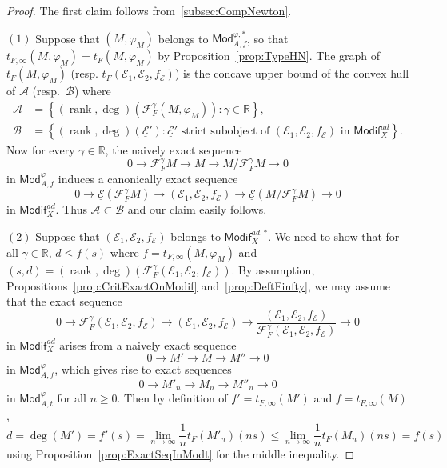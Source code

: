 \documentclass[11pt]{article}
\theoremstyle{definition}
\numberwithin{equation}{section}
\numberwithin{figure}{section}
\numberwithin{table}{section}
\newcommand{\Mod}{\mathsf{Mod}}
\newcommand{\Modif}{\mathsf{Modif}}
\DeclareMathOperator{\rank}{rank}
\begin{document}
\begin{proof}
The first claim follows from~\ref{subsec:CompNewton}.

$(1)$
Suppose that $(M,\varphi_{M})$ belongs to $\Mod_{A,f}^{\varphi,\ast}$, so that $t_{F,\infty}(M,\varphi_{M})=t_{F}(M,\varphi_{M})$ by Proposition~\ref{prop:TypeHN}. The graph of $t_{F}(M,\varphi_{M})$ (resp. $t_{F}(\mathcal{E}_{1},\mathcal{E}_{2},f_{\mathcal{E}})$) is the concave upper bound of the convex hull of $\mathcal{A}$ (resp.~$\mathcal{B}$) where
\begin{align*}
\mathcal{A} & = \left\{ (\rank,\deg)\left(\mathcal{F}_{F}^{\gamma}(M,\varphi_{M})\right):\gamma\in\mathbb{R}\right\},\\
\mathcal{B} & = \left\{ (\rank,\deg)\left(\underline{\mathcal{E}}'\right):\underline{\mathcal{E}}'\text{ strict subobject of }(\mathcal{E}_{1},\mathcal{E}_{2},f_{\mathcal{E}})\text{ in }\Modif_{X}^{ad}\right\}.
\end{align*}
Now for every $\gamma\in\mathbb{R}$, the naively exact sequence
\[
0\rightarrow\mathcal{F}_{F}^{\gamma}M\rightarrow M\rightarrow M/\mathcal{F}_{F}^{\gamma}M\rightarrow0
\]
in $\Mod_{A,f}^{\varphi}$ induces a canonically exact sequence
\[
0\rightarrow\underline{\mathcal{E}}\left(\mathcal{F}_{F}^{\gamma}M\right)\rightarrow(\mathcal{E}_{1},\mathcal{E}_{2},f_{\mathcal{E}})\rightarrow\underline{\mathcal{E}}\left(M/\mathcal{F}_{F}^{\gamma}M\right)\rightarrow0
\]
in $\Modif_{X}^{ad}$. Thus $\mathcal{A}\subset\mathcal{B}$ and our claim easily follows.

$(2)$
Suppose that $(\mathcal{E}_{1},\mathcal{E}_{2},f_{\mathcal{E}})$ belongs to $\Modif_{X}^{ad,\ast}$. We need to show that for all $\gamma\in\mathbb{R}$, $d\leq f(s)$ where $f=t_{F,\infty}(M,\varphi_{M})$ and $(s,d)=(\rank,\deg)\left(\mathcal{F}_{F}^{\gamma}(\mathcal{E}_{1},\mathcal{E}_{2},f_{\mathcal{E}})\right)$. By assumption, Propositions~\ref{prop:CritExactOnModif} and~\ref{prop:DeftFinfty}, we may assume that the exact sequence
\[
0\rightarrow\mathcal{F}_{F}^{\gamma}(\mathcal{E}_{1},\mathcal{E}_{2},f_{\mathcal{E}})\rightarrow(\mathcal{E}_{1},\mathcal{E}_{2},f_{\mathcal{E}})\rightarrow\frac{(\mathcal{E}_{1},\mathcal{E}_{2},f_{\mathcal{E}})}{\mathcal{F}_{F}^{\gamma}(\mathcal{E}_{1},\mathcal{E}_{2},f_{\mathcal{E}})}\rightarrow0
\]
in $\Modif_{X}^{ad}$ arises from a naively exact sequence
\[
0\rightarrow M'\rightarrow M\rightarrow M''\rightarrow0
\]
in $\Mod_{A,f}^{\varphi}$, which gives rise to exact sequences
\[
0\rightarrow M'_{n}\rightarrow M_{n}\rightarrow M''_{n}\rightarrow0
\]
in $\Mod_{A,t}^{\varphi}$ for all $n\geq0$. Then by definition of $f'=t_{F,\infty}(M')$ and $f=t_{F,\infty}(M)$,
\[
d=\deg(M')=f'(s)=\lim_{n\rightarrow\infty}{\frac{1}{n}}t_{F}(M'_{n})(ns)\leq\lim_{n\rightarrow\infty}{\frac{1}{n}}t_{F}(M{}_{n})(ns)=f(s)
\]
using Proposition~\ref{prop:ExactSeqInModt} for the middle inequality.


\end{proof}
\end{document}
